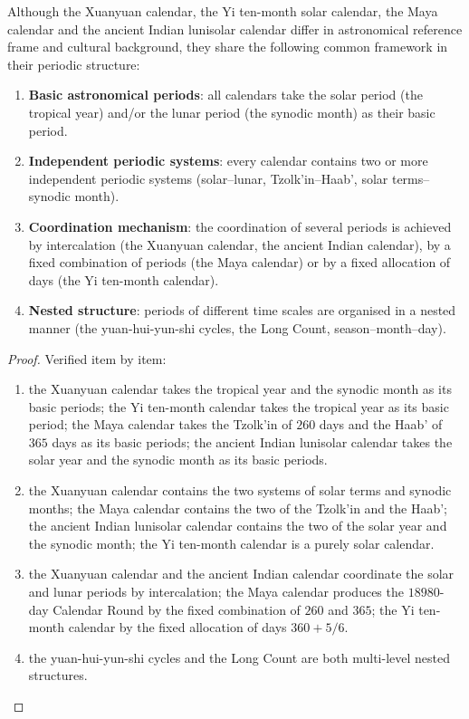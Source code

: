 \begin{theorem}\label{thm:world_calendar_unification}
Although the Xuanyuan calendar, the Yi ten-month solar calendar, the Maya calendar and the ancient Indian lunisolar calendar differ in astronomical reference frame and cultural background, they share the following common framework in their periodic structure:
\begin{enumerate}[label=(\roman*)]
    \item \textbf{Basic astronomical periods}: all calendars take the solar period (the tropical year) and/or the lunar period (the synodic month) as their basic period.
    \item \textbf{Independent periodic systems}: every calendar contains two or more independent periodic systems (solar--lunar, Tzolk'in--Haab', solar terms--synodic month).
    \item \textbf{Coordination mechanism}: the coordination of several periods is achieved by intercalation (the Xuanyuan calendar, the ancient Indian calendar), by a fixed combination of periods (the Maya calendar) or by a fixed allocation of days (the Yi ten-month calendar).
    \item \textbf{Nested structure}: periods of different time scales are organised in a nested manner (the yuan-hui-yun-shi cycles, the Long Count, season--month--day).
\end{enumerate}
\end{theorem}

\begin{proof}
Verified item by item:
\begin{enumerate}[label=(\roman*)]
\item the Xuanyuan calendar takes the tropical year and the synodic month as its basic periods; the Yi ten-month calendar takes the tropical year as its basic period; the Maya calendar takes the Tzolk'in of \(260\) days and the Haab' of \(365\) days as its basic periods; the ancient Indian lunisolar calendar takes the solar year and the synodic month as its basic periods.
\item the Xuanyuan calendar contains the two systems of solar terms and synodic months; the Maya calendar contains the two of the Tzolk'in and the Haab'; the ancient Indian lunisolar calendar contains the two of the solar year and the synodic month; the Yi ten-month calendar is a purely solar calendar.
\item the Xuanyuan calendar and the ancient Indian calendar coordinate the solar and lunar periods by intercalation; the Maya calendar produces the \(18980\)-day Calendar Round by the fixed combination of \(260\) and \(365\); the Yi ten-month calendar by the fixed allocation of days \(360+5/6\).
\item the yuan-hui-yun-shi cycles and the Long Count are both multi-level nested structures.
\end{enumerate}
\end{proof}

